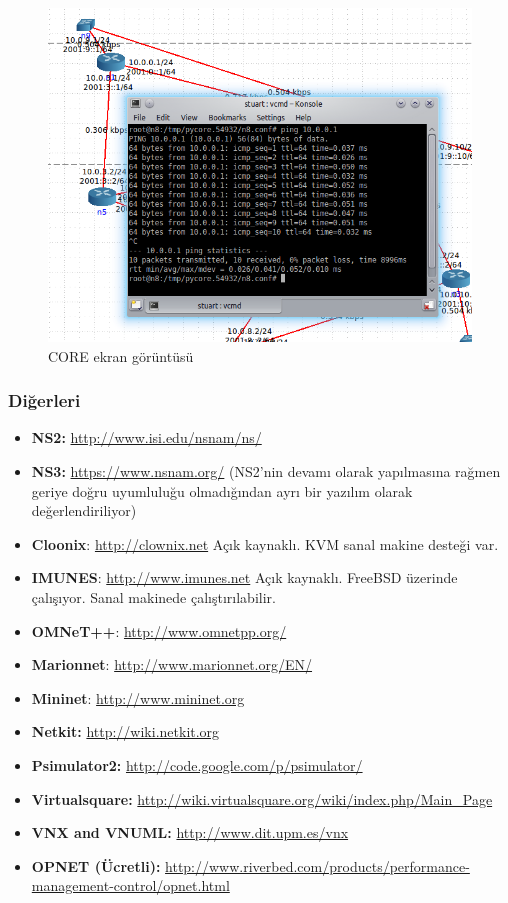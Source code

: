 \begin{figure}[H]
    \centering
    \includegraphics[width=\textwidth]{images/SimulatorCORE.png}
    \caption{CORE ekran görüntüsü}
    \label{fig:CORE}
\end{figure}

\subsubsection{Diğerleri}

\begin{itemize}
\item \textbf{NS2:} \url{http://www.isi.edu/nsnam/ns/}
\item \textbf{NS3:} \url{https://www.nsnam.org/} (NS2'nin devamı olarak yapılmasına rağmen geriye doğru uyumluluğu
olmadığından ayrı bir yazılım olarak değerlendiriliyor)
\end{itemize}

\begin{itemize}
\item \textbf{Cloonix}: \href{http://clownix.net/}{http://clownix.net} Açık kaynaklı. KVM sanal makine desteği var.
\item \textbf{IMUNES}: \href{http://www.imunes.net/}{http://www.imunes.net} Açık kaynaklı. FreeBSD üzerinde çalışıyor.
Sanal makinede çalıştırılabilir.
\item \textbf{OMNeT++}: \url{http://www.omnetpp.org/}
\item \textbf{Marionnet}: \url{http://www.marionnet.org/EN/}
\item \textbf{Mininet}: \href{http://www.mininet.org/}{http://www.mininet.org}
\item \textbf{Netkit:} \href{http://wiki.netkit.org/}{http://wiki.netkit.org}
\item \textbf{Psimulator2:} \url{http://code.google.com/p/psimulator/}
\item \textbf{Virtualsquare:} \url{http://wiki.virtualsquare.org/wiki/index.php/Main_Page}
\item \textbf{VNX and VNUML:} \url{http://www.dit.upm.es/vnx}
\item \textbf{OPNET (Ücretli):} \url{http://www.riverbed.com/products/performance-management-control/opnet.html}
\end{itemize}
